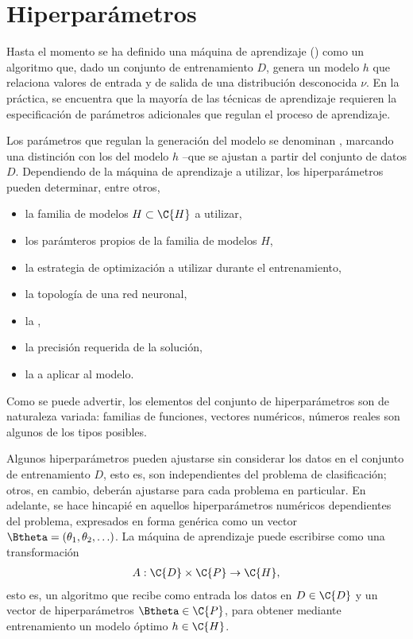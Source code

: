 %
%
%
\section{Hiperparámetros}
%
Hasta el momento se ha definido una máquina de aprendizaje
() como un algoritmo que, dado un conjunto
de entrenamiento $D$, genera un modelo $h$ que relaciona valores de
entrada y de salida de una distribución desconocida $\nu$. En la
práctica, se encuentra que la mayoría de las técnicas de aprendizaje
requieren la especificación de parámetros adicionales que regulan el
proceso de aprendizaje.

Los parámetros que regulan la generación del modelo se denominan
, marcando una distinción con los 
del modelo $h$ --que se ajustan a partir del conjunto de datos
$D$. Dependiendo de la máquina de aprendizaje a utilizar, los
hiperparámetros pueden determinar, entre otros,
%
\begin{itemize}
\item la familia de modelos $H\subset\C{H}$ a utilizar,
\item los parámteros propios de la familia de modelos $H$,
\item la estrategia de optimización a utilizar durante el
  entrenamiento,
\item la topología de una red neuronal,
\item la ,
\item la precisión requerida de la solución,
\item la  a aplicar al modelo.
\end{itemize}
%
Como se puede advertir, los elementos del conjunto de hiperparámetros
son de naturaleza variada: familias de funciones, vectores numéricos,
números reales son algunos de los tipos posibles.

Algunos hiperparámetros pueden ajustarse sin considerar los datos en
el conjunto de entrenamiento $D$, esto es, son independientes del
problema de clasificación; otros, en cambio, deberán ajustarse para
cada problema en particular. En adelante, se hace hincapié en aquellos
hiperparámetros numéricos dependientes del problema, expresados en
forma genérica como un vector
$\Btheta=(\theta_1,\theta_2,\ldots)$. La máquina de
aprendizaje puede escribirse como una transformación
%
\begin{align}
  A:\C{D}\times\C{P}\rightarrow\C{H},
\end{align}
%
esto es, un algoritmo que recibe como entrada los datos en $D\in\C{D}$
y un vector de hiperparámetros $\Btheta\in\C{P}$, para obtener
mediante entrenamiento un modelo óptimo $h\in\C{H}$.
%
%
